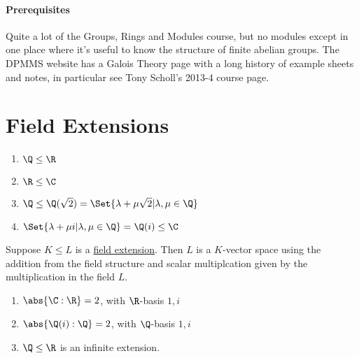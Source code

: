 \documentclass{article}
\begin{document}
\paragraph{Prerequisites} Quite a lot of the Groups, Rings and Modules course, but no modules except in one place where it's useful to know the structure of finite abelian groups.
The DPMMS website has a Galois Theory page with a long history of example sheets and notes, in particular see Tony Scholl's 2013-4 course page.
\clearpage

\section{Field Extensions}

\begin{eg}
    \leavevmode
    \begin{enumerate}[label=(\roman*)]
        \item $\Q \leq \R$
        \item $\R \leq \C$
        \item $\Q \leq \Q(\sqrt{2}) = \Set{\lambda + \mu \sqrt{2} | \lambda, \mu \in \Q}$
        \item $\Set{\lambda + \mu i | \lambda, \mu \in \Q} = \Q(i) \leq \C$
    \end{enumerate}
\end{eg}

Suppose $K \leq L$ is a \hyperlink{def:fieldExt}{field extension}. Then $L$ is a $K$-vector space using the addition from the field structure and scalar multiplcation given by the multiplication in the field $L$.


\begin{eg}\leavevmode
    \begin{enumerate}[label=(\roman*)]
        \item $\abs{\C:\R} = 2$, with $\R$-basis $1, i$
        \item $\abs{\Q(i):\Q} = 2$, with $\Q$-basis $1, i$
        \item $\Q \leq \R$ is an infinite extension.
    \end{enumerate}
\end{eg}
\end{document}

